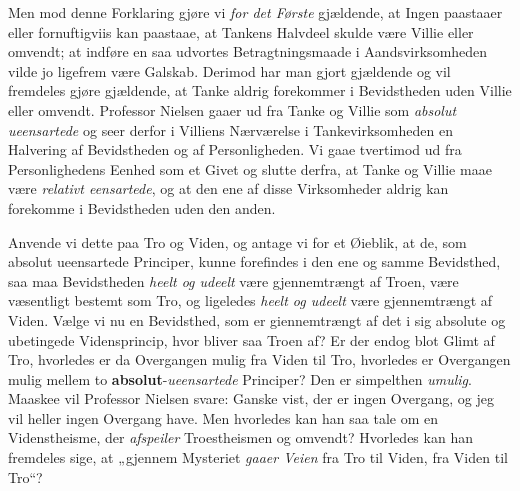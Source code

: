 \documentclass[12pt,a4paper]{book}
\newcommand{\opage}[1]{\marginnote{\footnotesize\textit{[#1]}}}
\begin{document}
Men mod denne Forklaring gjøre vi \emph{for det Første}
gjældende, at Ingen paastaaer eller fornuftigviis kan paastaae,
at Tankens Halvdeel skulde være Villie eller omvendt;
at indføre en saa udvortes Betragtningsmaade i
Aandsvirksomheden vilde jo ligefrem være Galskab. Derimod
har man gjort gjældende og vil fremdeles gjøre
gjældende, at Tanke aldrig forekommer i Bevidstheden
uden Villie eller omvendt. Professor Nielsen gaaer ud
fra Tanke og Villie som \emph{absolut ueensartede} og
seer derfor i Villiens Nærværelse i Tankevirksomheden
en Halvering af Bevidstheden og af Personligheden. Vi
gaae tvertimod ud fra Personlighedens Eenhed som et
Givet og slutte derfra, at Tanke og Villie maae være
\emph{relativt eensartede}, og at den ene af disse Virksomheder
aldrig kan forekomme i Bevidstheden uden den anden.

\opage{47}\setcounter{footnote}{0}%
Anvende vi dette paa Tro og Viden, og antage vi
for et Øieblik, at de, som absolut ueensartede Principer,
kunne forefindes i den ene og samme Bevidsthed,
saa maa Bevidstheden \emph{heelt og udeelt} være gjennemtrængt
af Troen, være væsentligt bestemt som Tro, og
ligeledes \emph{heelt og udeelt} være gjennemtrængt af Viden.
Vælge vi nu en Bevidsthed, som er giennemtrængt
af det i sig absolute og ubetingede Vidensprincip, hvor
bliver saa Troen af? Er der endog blot Glimt af
Tro, hvorledes er da Overgangen mulig fra Viden til
Tro, hvorledes er Overgangen mulig mellem to \textbf{absolut}-\emph{ueensartede}
Principer? Den er simpelthen \emph{umulig}.
Maaskee vil Professor Nielsen svare: Ganske vist, der
er ingen Overgang, og jeg vil heller ingen Overgang have.
Men hvorledes kan han saa tale om en Videnstheisme,
der \emph{afspeiler} Troestheismen og omvendt? Hvorledes
kan han fremdeles sige, at „gjennem Mysteriet \emph{gaaer
Veien} fra Tro til Viden, fra Viden til Tro“?
\end{document}
